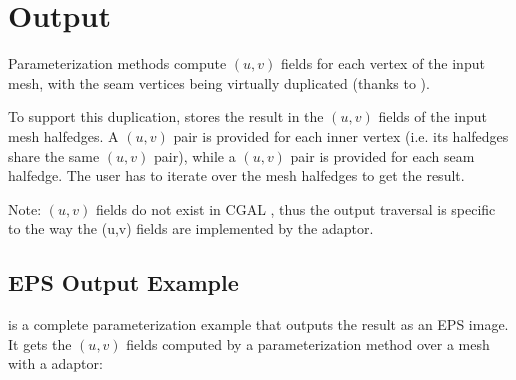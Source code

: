 \section{Output}

Parameterization methods compute $(u,v)$ fields for each vertex
of the input mesh, with the seam vertices being virtually duplicated (thanks
to ).

To support this duplication,
 stores
the result in the $(u,v)$ fields of the input mesh halfedges.
A $(u,v)$ pair is provided for
each inner vertex (i.e. its halfedges share the same $(u,v)$ pair),
while a $(u,v)$ pair is provided for each seam halfedge.
The user has to iterate over the mesh halfedges to get the result.

Note: $(u,v)$ fields do not exist in CGAL ,
thus the output traversal is specific to the way the (u,v) fields are implemented by the adaptor.

\subsection{EPS Output Example}

 is a complete parameterization
example that outputs the result as an EPS image.
It gets the $(u,v)$ fields computed by a
parameterization method over a  mesh with a
 adaptor:


